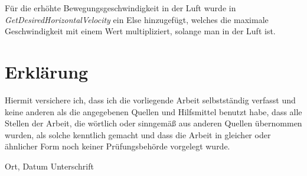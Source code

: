 \renewcommand{\baselinestretch}{1}\normalsize

\renewcommand{\baselinestretch}{1.5}\normalsize

\newpage
Für die erhöhte Bewegungsgeschwindigkeit in der Luft wurde in \textit{GetDesiredHorizontalVelocity} ein Else hinzugefügt, welches die maximale Geschwindigkeit mit einem Wert multipliziert, solange man in der Luft ist.

\renewcommand{\baselinestretch}{1}\normalsize

\renewcommand{\baselinestretch}{1.5}\normalsize





\chapter*{Erklärung}
\vspace{-20pt}
Hiermit versichere ich, dass ich die vorliegende Arbeit selbstständig verfasst und keine anderen als die angegebenen Quellen und Hilfsmittel benutzt habe, dass alle Stellen der Arbeit, die wörtlich oder sinngemäß aus anderen Quellen übernommen wurden, als solche kenntlich gemacht und dass die Arbeit in gleicher oder ähnlicher Form noch keiner Prüfungsbehörde vorgelegt wurde.

\vspace{3cm}
Ort, Datum \hspace{5cm} Unterschrift\\

